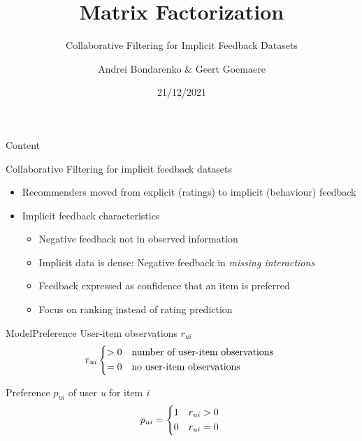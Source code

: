 \documentclass[aspectratio=1610]{beamer}
\title{Matrix Factorization}
\subtitle{Collaborative Filtering for Implicit Feedback Datasets}
\date{21/12/2021}
\author{Andrei Bondarenko \& Geert Goemaere}
\begin{document}
\begin{frame}[negativefill]
  \maketitle
\end{frame}

\begin{frame}
    {Content}
\end{frame}

\begin{frame}{Collaborative Filtering for implicit feedback datasets}
\begin{itemize}
    \item Recommenders moved from explicit (ratings) to implicit (behaviour) feedback
    \item Implicit feedback characteristics
        \begin{itemize}
            \item Negative feedback not in observed information
            \item Implicit data is dense: Negative feedback in \textit{missing interactions}
            \item Feedback expressed as confidence that an item is preferred 
            \item Focus on ranking instead of rating prediction 
        \end{itemize}
    \end{itemize}
\end{frame}

\begin{frame}{Model}{Preference}
    User-item observations $r_{ui}$
    \begin{equation*}
        r_{ui} \begin{dcases*}
            > 0 & number of user-item observations \\
            = 0 & no user-item observations
            \end{dcases*}
    \end{equation*}
    
    Preference $p_{ui}$ of user \textit{u} for item \textit{i}
    \begin{equation*}
        p_{ui} = \begin{dcases*}
            1 & $r_{ui} > 0$ \\
            0 & $r_{ui} = 0$
            \end{dcases*}
    \end{equation*}
\end{frame}
\end{document}
